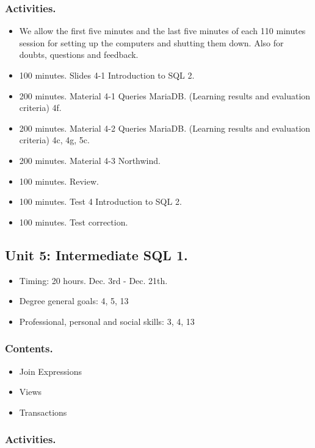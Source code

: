 \documentclass[catalan, a4paper, 12pt, titlepage]{article}
\begin{document}
  \subsubsection{Activities.}

  \begin{itemize}
          \item We allow the first five minutes and the last five minutes of each 110 minutes session for setting up the computers and shutting them down. Also for doubts, questions and feedback.
	  \item 100 minutes. Slides 4-1 Introduction to SQL 2.
	  \item 200 minutes. Material 4-1 Queries MariaDB. (\faGraduationCap Learning results and evaluation criteria) 4f.
	  \item 200 minutes. Material 4-2 Queries MariaDB. (\faGraduationCap Learning results and evaluation criteria) 4c, 4g, 5c.
	  \item 200 minutes. Material 4-3 Northwind.
	  \item 100 minutes. Review.
	  \item 100 minutes. Test 4 Introduction to SQL 2.
	  \item 100 minutes. Test correction.
  \end{itemize}

  \subsection{Unit 5: Intermediate SQL 1.}
  
  \begin{itemize}
	\item Timing: 20 hours. Dec. 3rd - Dec. 21th.
	\item Degree general goals: 4, 5, 13
	\item Professional, personal and social skills: 3, 4, 13
  \end{itemize}

  \subsubsection{Contents.}

  \begin{itemize}
	  \item Join Expressions
	  \item Views
	  \item Transactions
  \end{itemize}

  \subsubsection{Activities.}
\end{document}
